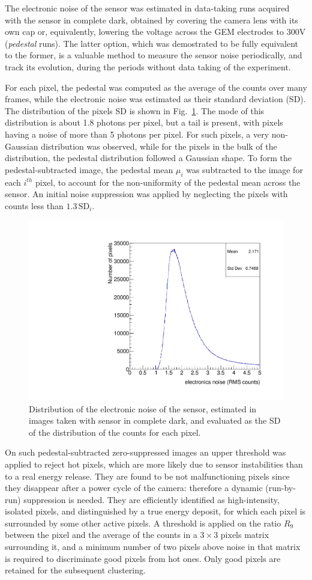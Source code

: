 The electronic noise of the sensor was estimated in data-taking runs
acquired with the sensor in complete dark, obtained by covering the
camera lens with its own cap or, equivalently, lowering the voltage
across the GEM electrodes to 300\unit{V} ({\it pedestal} runs). The
latter option, which was demostrated to be fully equivalent to the
former, is a valuable method to measure the sensor noise periodically,
and track its evolution, during the periods without data taking of
the \cygno experiment.

For each pixel, the pedestal was computed as the average of the counts
over many frames, while the electronic noise was estimated as their
standard deviation (SD). The distribution of the pixels SD is shown in
Fig.~\ref{fig:noise}. The mode of this distribution is about 1.8
photons per pixel, but a tail is present, with pixels having a noise
of more than 5 photons per pixel. For such pixels, a very non-Gaussian
distribution was observed, while for the pixels in the bulk of the
distribution, the pedestal distribution followed a Gaussian shape. To
form the pedestal-subtracted image, the pedestal mean $\mu_i$ was
subtracted to the image for each $i^{th}$ pixel, to account for the
non-uniformity of the pedestal mean across the sensor. An initial
noise suppression was applied by neglecting the pixels with counts
less than $1.3\,\textrm{SD}_i$.
%
\begin{figure}[ht]
  \centering
  \includegraphics[width=0.45\linewidth]{figures/sensor_noise}
  \caption{Distribution of the electronic noise of the sensor,
    estimated in images taken with sensor in complete dark, and
    evaluated as the SD of the distribution of the counts for each
    pixel.  \label{fig:noise}}
\end{figure}
%
On such pedestal-subtracted zero-suppressed images an upper threshold
was applied to reject hot pixels, which are more likely due to sensor
instabilities than to a real energy release. They are found to be not
malfunctioning pixels since they disappear after a power cycle of the
camera: therefore a dynamic (run-by-run) suppression is needed.  They
are efficiently identified as high-intensity, isolated pixels, and
distinguished by a true energy deposit, for which each pixel is
surrounded by some other active pixels. A threshold is applied on the
ratio $R_9$ between the pixel and the average of the counts in a
$3{\times}3$ pixels matrix surrounding it, and a minimum number of two
pixels above noise in that matrix is required to discriminate good
pixels from hot ones. Only good pixels are retained for the subsequent
clustering.

